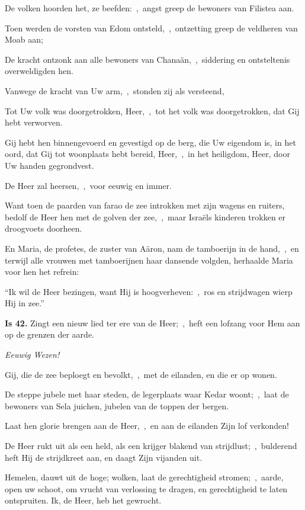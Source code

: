 \documentclass[12pt,twoside,a5paper]{article}
\begin{document}
\begin{halfparskip}
  De volken hoorden het, ze beefden:~\sep\ angst greep de bewoners van Filistea aan.

  Toen werden de vorsten van Edom ontsteld,~\sep\ ontzetting greep de veldheren van Moab aan;

  De kracht ontzonk aan alle bewoners van Chanaän,~\sep\ siddering en ontsteltenis overweldigden hen.

  Vanwege de kracht van Uw arm,~\sep\ stonden zij als versteend,

  Tot Uw volk was doorgetrokken, Heer,~\sep\ tot het volk was doorgetrokken, dat Gij hebt verworven.

  Gij hebt hen binnengevoerd en gevestigd op de berg, die Uw eigendom is, in het oord, dat Gij tot woonplaats hebt bereid, Heer,~\sep\ in het heiligdom, Heer, door Uw handen gegrondvest.

  De Heer zal heersen,~\sep\ voor eeuwig en immer.

  Want toen de paarden van farao de zee introkken met zijn wagens en ruiters, bedolf de Heer hen met de golven der zee,~\sep\ maar Israëls kinderen trokken er droogvoets doorheen.

  En Maria, de profetes, de zuster van Aäron, nam de tamboerijn in de hand,~\sep\ en terwijl alle vrouwen met tamboerijnen haar dansende volgden, herhaalde Maria voor hen het refrein:

  ``Ik wil de Heer bezingen, want Hij is hoogverheven:~\sep\ ros en strijdwagen wierp Hij in zee.''
\end{halfparskip}

\begin{halfparskip}
  \textbf{Is 42.} Zingt een nieuw lied ter ere van de Heer;~\sep\ heft een lofzang voor Hem aan op de grenzen der aarde.


   \emph{Eeuwig Wezen!}

  Gij, die de zee beploegt en bevolkt,~\sep\ met de eilanden, en die er op wonen.

  De steppe jubele met haar steden, de legerplaats waar Kedar woont;~\sep\ laat de bewoners van Sela juichen, jubelen van de toppen der bergen.

  Laat hen glorie brengen aan de Heer,~\sep\ en aan de eilanden Zijn lof verkonden!

  De Heer rukt uit als een held, als een krijger blakend van strijdlust;~\sep\ bulderend heft Hij de strijdkreet aan, en daagt Zijn vijanden uit.

  Hemelen, dauwt uit de hoge; wolken, laat de gerechtigheid stromen;~\sep\ aarde, open uw schoot, om vrucht van verlossing te dragen, en gerechtigheid te laten ontspruiten. Ik, de Heer, heb het gewrocht.
\end{halfparskip}
\end{document}

